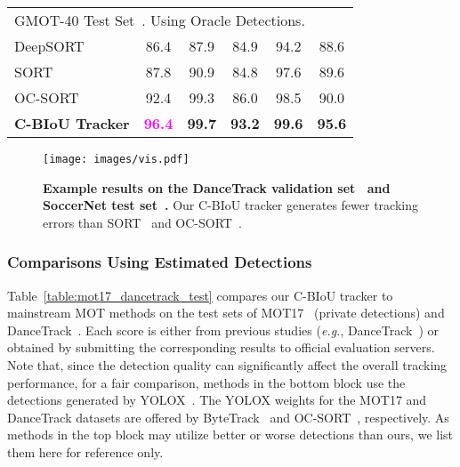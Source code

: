 \documentclass[journal]{IEEEtran}
\newcommand{\eg}{{\it e.g.}}
\begin{document}
\begin{table}[t]
\begin{tabular}{ l ccccc}
   \hline
\multicolumn{6}{l}{GMOT-40 Test Set~\cite{bai2021gmot}. Using Oracle Detections. }   \\
DeepSORT~\cite{DeepSORT}  &86.4 & 87.9 & 84.9 & 94.2 & 88.6\\
   SORT~\cite{SORT}  &87.8 & 90.9 & 84.8 & 97.6 & 89.6\\
   OC-SORT~\cite{cao2022observation}  & 92.4& 99.3 &  86.0 & 98.5  & 90.0\\
   \textbf{C-BIoU Tracker}  & \textcolor{magenta}{\textbf{96.4}} & \textbf{99.7} & \textbf{93.2} & \textbf{99.6} & \textbf{95.6}\\
   \bottomrule
   \end{tabular}
   \label{table:comparisons_on_oracle_detection}
\end{table}


\begin{figure*}[h!]
   \centering
   \texttt{[image: images/vis.pdf]}
   \caption{\textbf{Example results on the DanceTrack validation set~\cite{sun2022dancetrack} and SoccerNet test set~\cite{cioppa2022soccernet,deliege2021soccernet}.} Our C-BIoU tracker generates fewer tracking errors than SORT~\cite{SORT} and OC-SORT~\cite{cao2022observation}. }
   \label{fig:vis}
\end{figure*}



\subsubsection{Comparisons Using Estimated Detections}

Table~\ref{table:mot17_dancetrack_test} compares our C-BIoU tracker to mainstream MOT methods on the test sets of MOT17~\cite{MOT16} (private detections) and DanceTrack~\cite{sun2022dancetrack}. Each score is either from previous studies (\eg, DanceTrack~\cite{sun2022dancetrack}) or obtained by submitting the corresponding results to official evaluation servers. Note that, since the detection quality can significantly affect the overall tracking performance, for a fair comparison, methods in the bottom block use the detections generated by YOLOX~\cite{ge2021yolox}. The YOLOX weights for the MOT17 and DanceTrack datasets are offered by ByteTrack~\cite{sun2022dancetrack} and OC-SORT~\cite{cao2022observation}, respectively.
As methods in the top block may utilize better or worse detections than ours, we list them here for reference only. 
\end{document}
